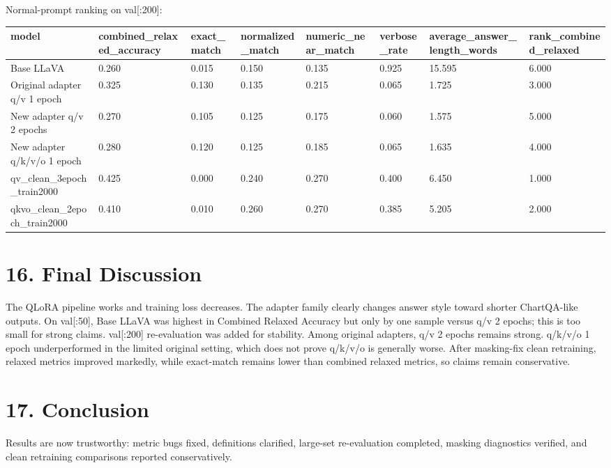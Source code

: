 \documentclass[11pt]{article}
\begin{document}
Normal-prompt ranking on val[:200]:
\begin{tabular}{llllllll}
\toprule
model & combined\_relaxed\_accuracy & exact\_match & normalized\_match & numeric\_near\_match & verbose\_rate & average\_answer\_length\_words & rank\_combined\_relaxed \\
\midrule
Base LLaVA & 0.260 & 0.015 & 0.150 & 0.135 & 0.925 & 15.595 & 6.000 \\
Original adapter q/v 1 epoch & 0.325 & 0.130 & 0.135 & 0.215 & 0.065 & 1.725 & 3.000 \\
New adapter q/v 2 epochs & 0.270 & 0.105 & 0.125 & 0.175 & 0.060 & 1.575 & 5.000 \\
New adapter q/k/v/o 1 epoch & 0.280 & 0.120 & 0.125 & 0.185 & 0.065 & 1.635 & 4.000 \\
qv\_clean\_3epoch\_train2000 & 0.425 & 0.000 & 0.240 & 0.270 & 0.400 & 6.450 & 1.000 \\
qkvo\_clean\_2epoch\_train2000 & 0.410 & 0.010 & 0.260 & 0.270 & 0.385 & 5.205 & 2.000 \\
\bottomrule
\end{tabular}


\section*{16. Final Discussion}
The QLoRA pipeline works and training loss decreases. The adapter family clearly changes answer style toward shorter ChartQA-like outputs. On val[:50], Base LLaVA was highest in Combined Relaxed Accuracy but only by one sample versus q/v 2 epochs; this is too small for strong claims. val[:200] re-evaluation was added for stability. Among original adapters, q/v 2 epochs remains strong. q/k/v/o 1 epoch underperformed in the limited original setting, which does not prove q/k/v/o is generally worse. After masking-fix clean retraining, relaxed metrics improved markedly, while exact-match remains lower than combined relaxed metrics, so claims remain conservative.

\section*{17. Conclusion}
Results are now trustworthy: metric bugs fixed, definitions clarified, large-set re-evaluation completed, masking diagnostics verified, and clean retraining comparisons reported conservatively.
\end{document}

